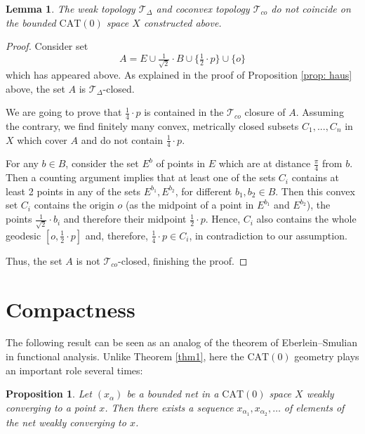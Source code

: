 \documentclass[12pt,leqno]{amsart}
\numberwithin{equation}{section}
\newtheorem{lem}[thm]{Lemma}
\newtheorem{prop}[thm]{Proposition}
\theoremstyle{remark}
\newcommand{\CAT}{\mathrm{CAT}}
\begin{document}
\begin{lem} \label{lem: differ}
	The weak topology $\mathcal T_{\Delta}$ and coconvex topology $\mathcal T_{co}$ do not coincide on the bounded $\CAT(0)$ space $X$ constructed above.
\end{lem}

\begin{proof}
Consider set 
$$A=E\cup \tfrac 1 {\sqrt 2} \cdot B \cup \{\tfrac 1 2 \cdot p\} \cup \{o\}$$ which has appeared above.
As explained in the proof of Proposition \ref{prop: haus} above, the set $A$ is $\mathcal T_{\Delta}$-closed.

We are going to prove that $\frac 1 4 \cdot p$ is contained in the $\mathcal T_{co}$ closure of $A$. Assuming the contrary, we find finitely many convex, metrically closed subsets $C_1,...,C_n$ in $X$ which cover $A$ and do not contain $\frac 1 4 \cdot p$. 

For any $b\in B$, consider the set $E^b$ of points in $E$ which are at distance $\frac \pi 4$ from $b$. Then a counting argument implies that at least one of the sets $C_i$ contains
at least 2 points in any of the sets $E^{b_1},E^{b_2}$, for different $b_1,b_2\in B$.
 Then this convex set $C_i$ contains the origin $o$ (as the midpoint of a point in $E^{b_1}$ and $E^{b_2}$), the points $\frac 1 {\sqrt 2} \cdot b_{i}$ and therefore their midpoint $\frac 1 2 \cdot p$. Hence, $C_i$ also contains the whole geodesic $[o,\frac 1 2 \cdot p]$ and, therefore, 
 $\frac 1 4 \cdot p \in C_i$, in contradiction to our assumption.

Thus, the set $A$ is not $\mathcal T_{co}$-closed, finishing the proof.
	\end{proof}

\section{Compactness} \label{sec: funct}

The following result can be seen as an analog of the theorem of Eberlein--Smulian in functional analysis. Unlike Theorem \ref{thm1}, here the $\CAT(0)$ geometry plays an important role several times: 

\begin{prop} \label{prop: eber}
	Let $(x_{\alpha})$ be a bounded net in a $\CAT(0)$ space $X$ weakly converging to a point $x$.
Then there exists a sequence $x_{\alpha_1},x_{\alpha_2},\dots$ of elements of the net weakly converging to $x$.
\end{prop}
\end{document}

